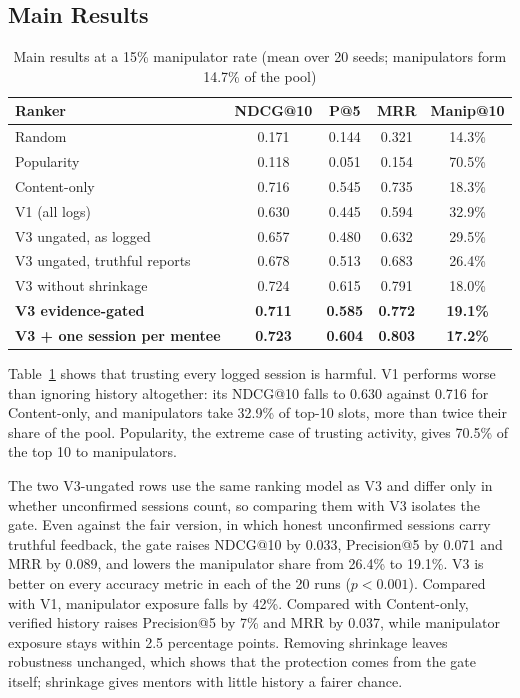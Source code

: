 \documentclass[12pt,a4paper]{report}
\begin{document}
\subsection{Main Results}
\begin{table}[h]
\centering
\caption{Main results at a 15\% manipulator rate (mean over 20 seeds; manipulators form 14.7\% of the pool)}
\label{tab:main}
\small
\begin{tabular}{lcccc}
\toprule
\textbf{Ranker} & \textbf{NDCG@10} & \textbf{P@5} & \textbf{MRR} & \textbf{Manip@10}\\
\midrule
Random & 0.171 & 0.144 & 0.321 & 14.3\%\\
Popularity & 0.118 & 0.051 & 0.154 & 70.5\%\\
Content-only & 0.716 & 0.545 & 0.735 & 18.3\%\\
V1 (all logs) & 0.630 & 0.445 & 0.594 & 32.9\%\\
V3 ungated, as logged & 0.657 & 0.480 & 0.632 & 29.5\%\\
V3 ungated, truthful reports & 0.678 & 0.513 & 0.683 & 26.4\%\\
V3 without shrinkage & 0.724 & 0.615 & 0.791 & 18.0\%\\
\textbf{V3 evidence-gated} & \textbf{0.711} & \textbf{0.585} & \textbf{0.772} & \textbf{19.1\%}\\
\textbf{V3 + one session per mentee} & \textbf{0.723} & \textbf{0.604} & \textbf{0.803} & \textbf{17.2\%}\\
\bottomrule
\end{tabular}
\end{table}

Table~\ref{tab:main} shows that trusting every logged session is harmful. V1 performs worse than ignoring history altogether: its NDCG@10 falls to 0.630 against 0.716 for Content-only, and manipulators take 32.9\% of top-10 slots, more than twice their share of the pool. Popularity, the extreme case of trusting activity, gives 70.5\% of the top 10 to manipulators.

The two V3-ungated rows use the same ranking model as V3 and differ only in whether unconfirmed sessions count, so comparing them with V3 isolates the gate. Even against the fair version, in which honest unconfirmed sessions carry truthful feedback, the gate raises NDCG@10 by 0.033, Precision@5 by 0.071 and MRR by 0.089, and lowers the manipulator share from 26.4\% to 19.1\%. V3 is better on every accuracy metric in each of the 20 runs ($p<0.001$). Compared with V1, manipulator exposure falls by 42\%. Compared with Content-only, verified history raises Precision@5 by 7\% and MRR by 0.037, while manipulator exposure stays within 2.5 percentage points. Removing shrinkage leaves robustness unchanged, which shows that the protection comes from the gate itself; shrinkage gives mentors with little history a fairer chance.
\end{document}
